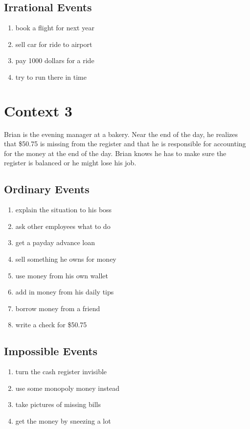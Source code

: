 \documentclass[11pt,letterpaper]{article}
\begin{document}
\subsection{Irrational Events}

\begin{enumerate}[resume]
    \item book a flight for next year
    \item sell car for ride to airport
    \item pay 1000 dollars for a ride
    \item try to run there in time
\end{enumerate}



\section{Context 3}

Brian is the evening manager at a bakery. Near the end of the day, he realizes that \$50.75 is missing from the register and that he is responsible for accounting for the money at the end of the day. Brian knows he has to make sure the register is balanced or he might lose his job.

\subsection{ Ordinary Events}

\begin{enumerate}[resume]
    \item explain the situation to his boss
    \item ask other employees what to do
    \item get a payday advance loan
    \item sell something he owns for money
    \item use money from his own wallet
    \item add in money from his daily tips
    \item borrow money from a friend
    \item write a check for \$50.75
\end{enumerate}

\subsection{Impossible Events}

\begin{enumerate}[resume]
    \item turn the cash register invisible
    \item use some monopoly money instead
    \item take pictures of missing bills
    \item get the money by sneezing a lot
\end{enumerate}
\end{document}
